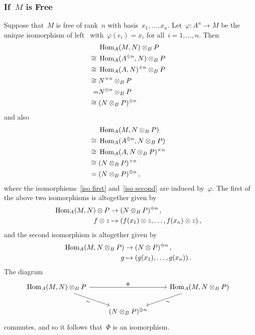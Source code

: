 \subsubsection{If~$M$ is Free}

Suppose that~$M$ is free of rank~$n$ with basis~$x_1, \dotsc, x_n$.
Let~$\varphi \colon A^n \to M$ be the unique isomorphism of left~{} with~$\varphi(e_i) = x_i$ for all~$i = 1, \dotsc, n$.
Then
\begin{align}
       {}&  \operatorname{Hom}_A(M, N) \otimes_B P  \notag  \\
  \cong{}&  \operatorname{Hom}_A(A^{\oplus n}, N) \otimes_B P \label{iso first} \\
  \cong{}&  \operatorname{Hom}_A(A, N)^{\times n} \otimes_B P \notag  \\
  \cong{}&  N^{\times n} \otimes_B P  \notag  \\
        =&  N^{\oplus n} \otimes_B P  \notag  \\
  \cong{}&  (N \otimes_B P)^{\oplus n}  \notag
\end{align}
and also
\begin{align}
       {}&  \operatorname{Hom}_A(M, N \otimes_B P)  \notag  \\
  \cong{}&  \operatorname{Hom}_A(A^{\oplus n}, N \otimes_B P) \label{iso second}  \\
  \cong{}&  \operatorname{Hom}_A(A, N \otimes_B P)^{\times n} \notag  \\
  \cong{}&  (N \otimes_B P)^{\times n}  \notag  \\
      ={}&  (N \otimes_B P)^{\oplus n}  \notag  \,,
\end{align}
where the isomorphisms~\eqref{iso first} and~\eqref{iso second} are induced by~$\varphi$.
The first of the above two isomorphisms is altogether given by
\begin{align*}
            \operatorname{Hom}_A(M, N) \otimes P
  &\to      (N \otimes_B P)^{\oplus n} \,,
  \\
            f \otimes z
  &\mapsto  ( f(x_1) \otimes z, \dotsc, f(x_n) \otimes z ) \,,
\end{align*}
and the second isomorphism is altogether given by
\begin{align*}
            \operatorname{Hom}_A(M, N \otimes_B P)
  &\to      (N \otimes P)^{\oplus n} \,,
  \\
            g
  &\mapsto  ( g(x_1), \dotsc, g(x_n) ) \,.
\end{align*}
The diagram
\[
  \begin{tikzcd}
      \Hom_A(M, N) \tensor_B P
      \arrow{dr}[below left]{\sim}
      \arrow{rr}[above]{\Phi}
    & {}
    & \Hom_A(M, N \tensor_B P)
      \arrow{dl}[below right]{\sim}
    \\
      {}
    & (N \tensor_B P)^{\oplus n}
    & {}
  \end{tikzcd}
\]
commutes, and so it follows that~$\Phi$ is an isomorphism.





